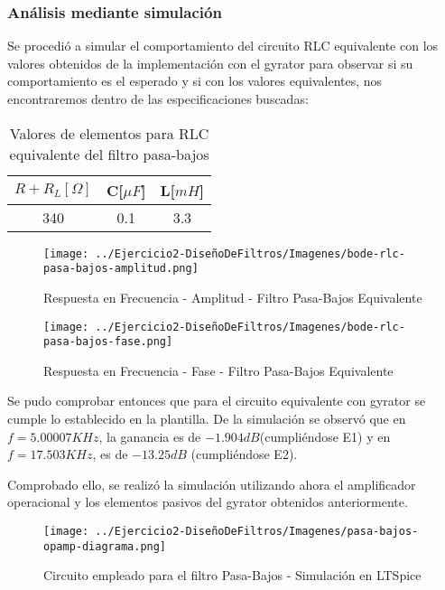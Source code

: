 \subsubsection{Análisis mediante simulación}

Se procedió a simular el comportamiento del circuito RLC equivalente con los valores obtenidos de la implementación con el 
gyrator para observar si su comportamiento es el esperado y si con los valores equivalentes, nos encontraremos dentro de las especificaciones
buscadas:

\begin{table}[H]
    \centering
    \begin{tabular}{|c|c|c|}
    \hline
    \rowcolor[HTML]{C0C0C0} 
    $R+R_L[\Omega]$ & C[$\mu F$] & L[$mH$]  \\ \hline
    340      & 0.1  & 3.3 \\ \hline
    \end{tabular}
    \caption{Valores de elementos para RLC equivalente del filtro pasa-bajos}
    \end{table}

\begin{figure}[H]
    \centering
    \texttt{[image: ../Ejercicio2-DiseñoDeFiltros/Imagenes/bode-rlc-pasa-bajos-amplitud.png]}
    \caption{Respuesta en Frecuencia - Amplitud - Filtro Pasa-Bajos Equivalente}
\end{figure}

\begin{figure}[H]
    \centering
    \texttt{[image: ../Ejercicio2-DiseñoDeFiltros/Imagenes/bode-rlc-pasa-bajos-fase.png]}
    \caption{Respuesta en Frecuencia - Fase - Filtro Pasa-Bajos Equivalente}
\end{figure}

Se pudo comprobar entonces que para el circuito equivalente con gyrator se cumple lo establecido en la plantilla.
De la simulación se observó que en $f=5.00007 KHz$, la ganancia es de $-1.904 dB$(cumpliéndose E1) y en $f=17.503KHz$, es de $-13.25 dB$
(cumpliéndose E2).


Comprobado ello, se realizó la simulación utilizando ahora el amplificador operacional y los elementos pasivos del gyrator obtenidos anteriormente.

\begin{figure}[H]
    \centering
    \texttt{[image: ../Ejercicio2-DiseñoDeFiltros/Imagenes/pasa-bajos-opamp-diagrama.png]}
    \caption{Circuito empleado para el filtro Pasa-Bajos - Simulación en LTSpice}
\end{figure}

